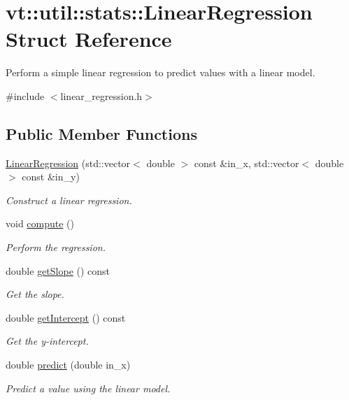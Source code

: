 \hypertarget{structvt_1_1util_1_1stats_1_1_linear_regression}{}\section{vt\+:\+:util\+:\+:stats\+:\+:Linear\+Regression Struct Reference}
\label{structvt_1_1util_1_1stats_1_1_linear_regression}


Perform a simple linear regression to predict values with a linear model.  




{\ttfamily \#include $<$linear\+\_\+regression.\+h$>$}

\subsection*{Public Member Functions}
\begin{DoxyCompactItemize}
\item 
\hyperlink{structvt_1_1util_1_1stats_1_1_linear_regression_a5ee7e2cca72dbd2d06acbd86529e40b4}{Linear\+Regression} (std\+::vector$<$ double $>$ const \&in\+\_\+x, std\+::vector$<$ double $>$ const \&in\+\_\+y)
\begin{DoxyCompactList}\small\item\em Construct a linear regression. \end{DoxyCompactList}\item 
void \hyperlink{structvt_1_1util_1_1stats_1_1_linear_regression_a6922dca6390a6285d68952debccd4c26}{compute} ()
\begin{DoxyCompactList}\small\item\em Perform the regression. \end{DoxyCompactList}\item 
double \hyperlink{structvt_1_1util_1_1stats_1_1_linear_regression_ad367d0b3bbcd51aed5513c0918b7fc9f}{get\+Slope} () const
\begin{DoxyCompactList}\small\item\em Get the slope. \end{DoxyCompactList}\item 
double \hyperlink{structvt_1_1util_1_1stats_1_1_linear_regression_a23b4e2e170789dc9632ad780fe4a4290}{get\+Intercept} () const
\begin{DoxyCompactList}\small\item\em Get the y-\/intercept. \end{DoxyCompactList}\item 
double \hyperlink{structvt_1_1util_1_1stats_1_1_linear_regression_a102993019adc0717da79336f8b631170}{predict} (double in\+\_\+x)
\begin{DoxyCompactList}\small\item\em Predict a value using the linear model. \end{DoxyCompactList}\end{DoxyCompactItemize}
